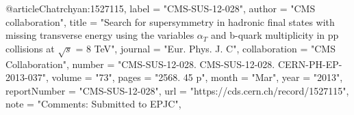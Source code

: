 @article{Chatrchyan:1527115,
      label          = "CMS-SUS-12-028",
      author        = "{CMS collaboration}",
      title         = "{Search for supersymmetry in hadronic final states with
                       missing transverse energy using the variables $\alpha_T$
                       and b-quark multiplicity in pp collisions at $\sqrt{s}$ = 8
                       TeV}",
      journal       = "Eur. Phys. J. C",
      collaboration = "CMS Collaboration",
      number        = "CMS-SUS-12-028. CMS-SUS-12-028. CERN-PH-EP-2013-037",
      volume        = "73",
      pages         = "2568. 45 p",
      month         = "Mar",
      year          = "2013",
      reportNumber  = "CMS-SUS-12-028",
      url           = "https://cds.cern.ch/record/1527115",
      note          = "Comments: Submitted to EPJC",
}
